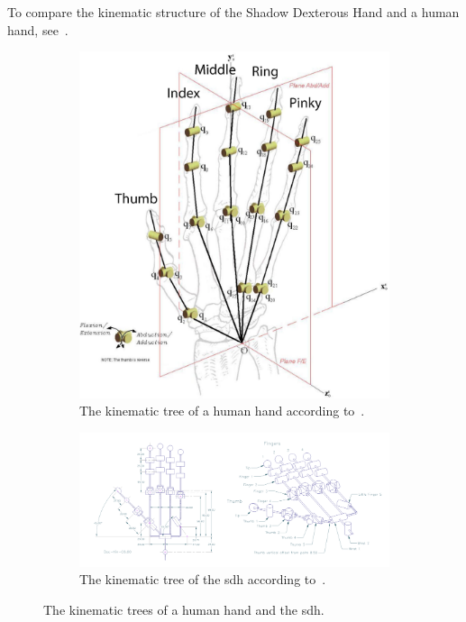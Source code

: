 To compare the kinematic structure of the Shadow Dexterous Hand and a human hand, see~.

\begin{figure}[!h]
	\centering
	\begin{subfigure}[b]{0.3\textwidth}
		\centering
		\includegraphics[width=\textwidth]{chapters/appendix/fig/human-hand-kinematics.pdf}
		\caption{The kinematic tree of a human hand according to~\cite{grasp-synthesis-algorithms-for-multifingered-robot-hands}.}
		\label{app:human-hand-kinematics}
	\end{subfigure}
	\hfill
	\begin{subfigure}[b]{0.69\textwidth}
		\centering
		\includegraphics[width=\textwidth]{chapters/appendix/fig/robot-hand-kinematics.pdf}
		\caption{The kinematic tree of the \gls{sdh} according to~\cite{robot-hand-kinematics}. \newline}
		\label{app:robot-hand-kinematics}
	\end{subfigure}
	\caption{The kinematic trees of a human hand and the \gls{sdh}.}
	\label{app:human-and-robot-hand-kinematics}
\end{figure}

